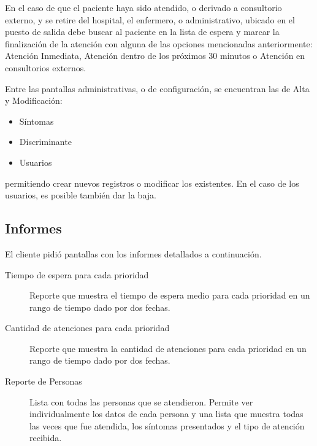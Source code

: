 En el caso de que el paciente haya sido atendido, o derivado a consultorio externo, y se retire del hospital, el enfermero, o administrativo, ubicado en el puesto de salida debe buscar al paciente en la lista de espera y marcar la finalización de la atención con alguna de las opciones mencionadas anteriormente: Atención Inmediata, Atención dentro de los próximos 30 minutos o Atención en consultorios externos.

Entre las pantallas administrativas, o de configuración, se encuentran las de Alta y Modificación:
\begin{itemize}
\item Síntomas
\item Discriminante
\item Usuarios
\end{itemize}
%
permitiendo crear nuevos registros o modificar los existentes. En el caso de los usuarios, es posible también dar la baja.




\subsection{Informes}
El cliente pidió pantallas con los informes detallados a continuación.

\begin{description}
\item[Tiempo de espera para cada prioridad] 

Reporte que muestra el tiempo de espera medio para cada prioridad en un rango de tiempo dado por dos fechas. 
\item[Cantidad de atenciones para cada prioridad] 

Reporte que muestra la cantidad de atenciones para cada prioridad en un rango de tiempo dado por dos fechas.
\item[Reporte de Personas] 

Lista con todas las personas que se atendieron. Permite ver individualmente los datos de cada persona y una lista que muestra todas las veces que fue atendida, los síntomas presentados y el tipo de atención recibida.
\end{description}
